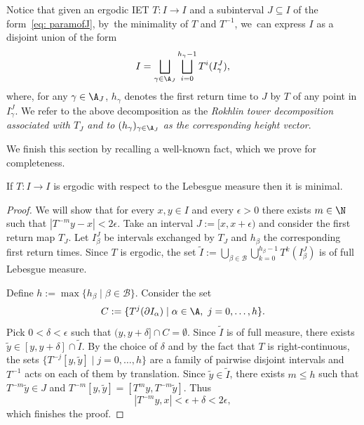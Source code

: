 Notice that given an ergodic IET $T: I \to I$ and a subinterval $J \subseteq I$ of the form~\eqref{eq: paramofJ}, by~the minimality of $T$ and $T^{-1}$, we~can express $I$ as a disjoint union of the form
\begin{equation}
\label{eq:towers_decomposition}
I = \bigsqcup_{\gamma \in \A_J} \bigsqcup_{i = 0}^{h_\gamma - 1} T^i(I_\gamma^J),
\end{equation}
where, for any $\gamma \in \A_J$, $h_\gamma$ denotes the first return time to $J$ by $T$ of any point in $I_\gamma^J$. We refer to the above decomposition as the \emph{Rokhlin tower decomposition associated with $T_J$ and to $(h_{\gamma})_{\gamma\in \A_J}$ as the corresponding \emph{height} vector}.

We finish this section by recalling a well-known fact, which we prove for completeness.

\begin{lemma}\label{lem: minimality}
If $T: I \to I$ is ergodic with respect to the Lebesgue measure then it is minimal.
\end{lemma}

\begin{proof}
We will show that for every $x,y\in I$ and every $\epsilon>0$ there exists $m\in\N$ such that $|T^{-m}y-x|<2\epsilon$. Take an interval $J:=[x,x+\epsilon)$ and consider the first return map $T_J$. Let $I^J_{\beta}$ be intervals exchanged by $T_J$ and $h_{\beta}$ the corresponding first return times. Since $T$ is ergodic, the set $\tilde I:=\bigcup_{\beta\in \mathcal B}\bigcup_{k=0}^{h_{\beta}-1} T^k(I^J_{\beta})$ is of full Lebesgue measure.

Define $h:=\max\{h_{\beta}\mid\beta\in\mathcal B\}$. Consider the set
\[
C:=\{T^{j}(\partial I_{\alpha})\mid \alpha\in\A,\ j=0,\ldots,h\}.
\]
Pick $0<\delta<\epsilon$ such that $(y,y+\delta]\cap C=\emptyset$. Since $\tilde I$ is of full measure, there exists $\tilde y\in[y,y+\delta]\cap \tilde I$. By the choice of $\delta$ and by the fact that $T$ is right-continuous, the sets $\{T^{-j}[y,\tilde y]\mid j=0,\ldots,h\}$ are a family of pairwise disjoint intervals and $T^{-1}$ acts on each of them by translation. Since $\tilde y\in\tilde I$, there exists $m\le h$ such that $T^{-m}\tilde y\in J$ and $T^{-m}[y,\tilde y]=[T^{m}y,T^{-m}\tilde y]$. Thus
\[
|T^{-m}y,x|<\epsilon+\delta<2\epsilon,
\]
which finishes the proof.
\end{proof}
